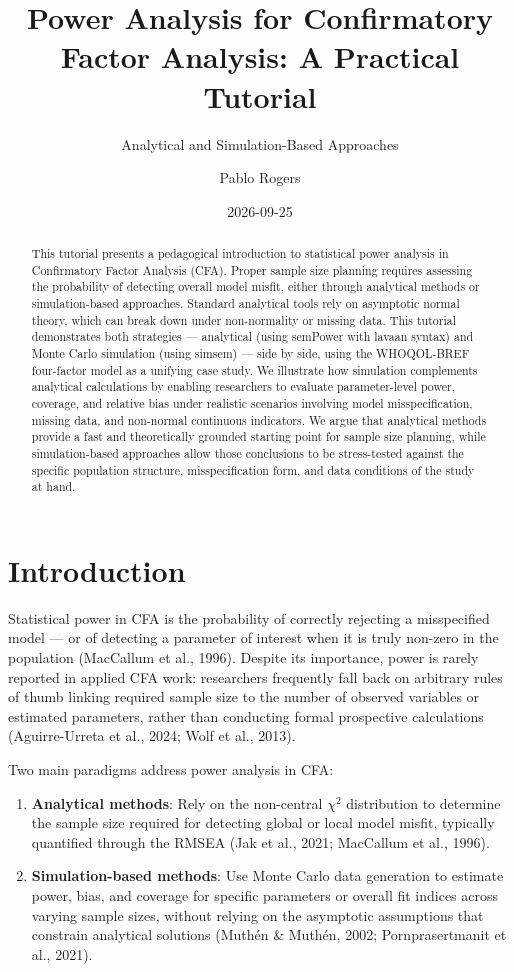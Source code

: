 \documentclass[
  letterpaper,
  DIV=11,
  numbers=noendperiod]{scrartcl}
\title{Power Analysis for Confirmatory Factor Analysis: A Practical
Tutorial}
\subtitle{Analytical and Simulation-Based Approaches}
\author{Pablo Rogers}
\date{2026-09-25}
\providecommand{\tightlist}{%
  \setlength{\itemsep}{0pt}\setlength{\parskip}{0pt}}
\begin{document}
\maketitle
\begin{abstract}
This tutorial presents a pedagogical introduction to statistical power
analysis in Confirmatory Factor Analysis (CFA). Proper sample size
planning requires assessing the probability of detecting overall model
misfit, either through analytical methods or simulation-based
approaches. Standard analytical tools rely on asymptotic normal theory,
which can break down under non-normality or missing data. This tutorial
demonstrates both strategies --- analytical (using semPower with lavaan
syntax) and Monte Carlo simulation (using simsem) --- side by side,
using the WHOQOL-BREF four-factor model as a unifying case study. We
illustrate how simulation complements analytical calculations by
enabling researchers to evaluate parameter-level power, coverage, and
relative bias under realistic scenarios involving model
misspecification, missing data, and non-normal continuous indicators. We
argue that analytical methods provide a fast and theoretically grounded
starting point for sample size planning, while simulation-based
approaches allow those conclusions to be stress-tested against the
specific population structure, misspecification form, and data
conditions of the study at hand.
\end{abstract}


\section{Introduction}\label{sec-intro}

Statistical power in CFA is the probability of correctly rejecting a
misspecified model --- or of detecting a parameter of interest when it
is truly non-zero in the population (MacCallum et al., 1996). Despite
its importance, power is rarely reported in applied CFA work:
researchers frequently fall back on arbitrary rules of thumb linking
required sample size to the number of observed variables or estimated
parameters, rather than conducting formal prospective calculations
(Aguirre-Urreta et al., 2024; Wolf et al., 2013).

Two main paradigms address power analysis in CFA:

\begin{enumerate}
\def\labelenumi{\arabic{enumi}.}
\tightlist
\item
  \textbf{Analytical methods}: Rely on the non-central \(\chi^2\)
  distribution to determine the sample size required for detecting
  global or local model misfit, typically quantified through the RMSEA
  (Jak et al., 2021; MacCallum et al., 1996).
\item
  \textbf{Simulation-based methods}: Use Monte Carlo data generation to
  estimate power, bias, and coverage for specific parameters or overall
  fit indices across varying sample sizes, without relying on the
  asymptotic assumptions that constrain analytical solutions (Muthén \&
  Muthén, 2002; Pornprasertmanit et al., 2021).
\end{enumerate}
\end{document}
